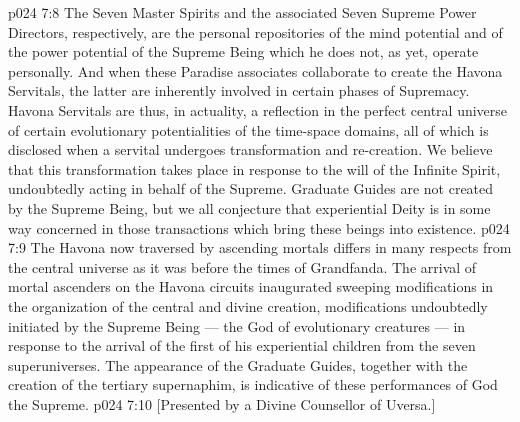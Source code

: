 \vs p024 7:8 \pc The Seven Master Spirits and the associated Seven Supreme Power Directors, respectively, are the personal repositories of the mind potential and of the power potential of the Supreme Being which he does not, as yet, operate personally. And when these Paradise associates collaborate to create the Havona Servitals, the latter are inherently involved in certain phases of Supremacy. Havona Servitals are thus, in actuality, a reflection in the perfect central universe of certain evolutionary potentialities of the time\hyp{}space domains, all of which is disclosed when a servital undergoes transformation and re\hyp{}creation. We believe that this transformation takes place in response to the will of the Infinite Spirit, undoubtedly acting in behalf of the Supreme. Graduate Guides are not created by the Supreme Being, but we all conjecture that experiential Deity is in some way concerned in those transactions which bring these beings into existence.
\vs p024 7:9 The Havona now traversed by ascending mortals differs in many respects from the central universe as it was before the times of Grandfanda. The arrival of mortal ascenders on the Havona circuits inaugurated sweeping modifications in the organization of the central and divine creation, modifications undoubtedly initiated by the Supreme Being --- the God of evolutionary creatures --- in response to the arrival of the first of his experiential children from the seven superuniverses. The appearance of the Graduate Guides, together with the creation of the tertiary supernaphim, is indicative of these performances of God the Supreme.
\vsetoff
\vs p024 7:10 [Presented by a Divine Counsellor of Uversa.]
